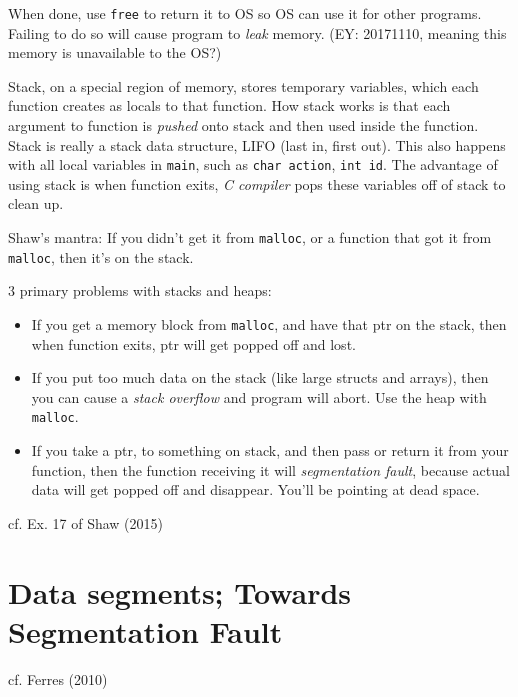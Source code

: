 \documentclass[10pt]{amsart}
\begin{document}
When done, use \verb|free| to return it to OS so OS can use it for other programs.  Failing to do so will cause program to \emph{leak} memory.  (EY: 20171110, meaning this memory is unavailable to the OS?)

Stack, on a special region of memory, stores temporary variables, which each function creates as locals to that function.  How stack works is that each argument to function is \emph{pushed} onto stack and then used inside the function.  Stack is really a stack data structure, LIFO (last in, first out).  This also happens with all local variables in \verb|main|, such as \verb|char action|, \verb|int id|.  The advantage of using stack is when function exits, \emph{C compiler} pops these variables off of stack to clean up.  

Shaw's mantra: If you didn't get it from \verb|malloc|, or a function that got it from \verb|malloc|, then it's on the stack.  

3 primary problems with stacks and heaps: 
\begin{itemize}
	\item If you get a memory block from \verb|malloc|, and have that ptr on the stack, then when function exits, ptr will get popped off and lost.  
	\item If you put too much data on the stack (like large structs and arrays), then you can cause a \emph{stack overflow} and program will abort.  Use the heap with \verb|malloc|.  
	\item If you take a ptr, to something on stack, and then pass or return it from your function, then the function receiving it will \emph{segmentation fault}, because actual data will get popped off and disappear.  You'll be pointing at dead space.  
\end{itemize}
cf. Ex. 17 of Shaw (2015) \cite{Shaw2015}


\section{Data segments; Towards Segmentation Fault}

cf. Ferres (2010) \cite{Ferr2010}
\end{document}
